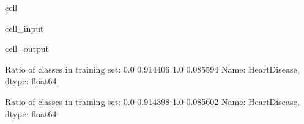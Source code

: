 \documentclass[letterpaper,10pt,english]{jupyterBook}
\begin{document}
\begin{sphinxuseclass}{cell}\begin{sphinxVerbatimInput}

\begin{sphinxuseclass}{cell_input}
\begin{sphinxVerbatim}[commandchars=\\\{\}]
      
\end{sphinxVerbatim}

\end{sphinxuseclass}\end{sphinxVerbatimInput}
\begin{sphinxVerbatimOutput}

\begin{sphinxuseclass}{cell_output}
\begin{sphinxVerbatim}[commandchars=\\\{\}]
Ratio of classes in training set:
0.0    0.914406
1.0    0.085594
Name: HeartDisease, dtype: float64

Ratio of classes in training set:
0.0    0.914398
1.0    0.085602
Name: HeartDisease, dtype: float64
\end{sphinxVerbatim}

\end{sphinxuseclass}\end{sphinxVerbatimOutput}

\end{sphinxuseclass}
\end{document}
